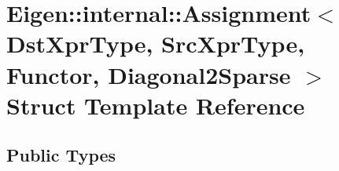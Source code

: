 \hypertarget{struct_eigen_1_1internal_1_1_assignment_3_01_dst_xpr_type_00_01_src_xpr_type_00_01_functor_00_01_diagonal2_sparse_01_4}{}\section{Eigen\+:\+:internal\+:\+:Assignment$<$ Dst\+Xpr\+Type, Src\+Xpr\+Type, Functor, Diagonal2\+Sparse $>$ Struct Template Reference}
\label{struct_eigen_1_1internal_1_1_assignment_3_01_dst_xpr_type_00_01_src_xpr_type_00_01_functor_00_01_diagonal2_sparse_01_4}
\subsection*{Public Types}
